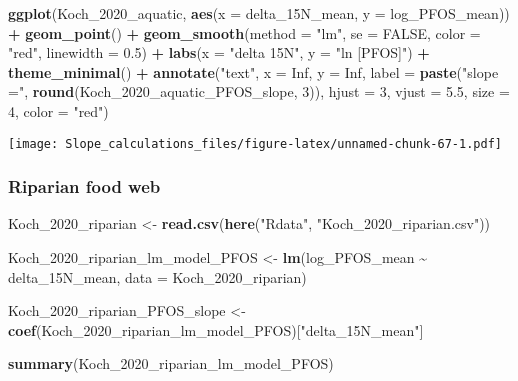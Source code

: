 \documentclass[
]{article}
\newenvironment{Shaded}{\begin{snugshade}}{\end{snugshade}}
\newcommand{\AttributeTok}[1]{\textcolor[rgb]{0.13,0.29,0.53}{#1}}
\newcommand{\ConstantTok}[1]{\textcolor[rgb]{0.56,0.35,0.01}{#1}}
\newcommand{\DecValTok}[1]{\textcolor[rgb]{0.00,0.00,0.81}{#1}}
\newcommand{\FloatTok}[1]{\textcolor[rgb]{0.00,0.00,0.81}{#1}}
\newcommand{\FunctionTok}[1]{\textcolor[rgb]{0.13,0.29,0.53}{\textbf{#1}}}
\newcommand{\NormalTok}[1]{#1}
\newcommand{\OtherTok}[1]{\textcolor[rgb]{0.56,0.35,0.01}{#1}}
\newcommand{\SpecialCharTok}[1]{\textcolor[rgb]{0.81,0.36,0.00}{\textbf{#1}}}
\newcommand{\StringTok}[1]{\textcolor[rgb]{0.31,0.60,0.02}{#1}}
\begin{document}
\begin{Shaded}
\begin{Highlighting}[]
\FunctionTok{ggplot}\NormalTok{(Koch\_2020\_aquatic, }\FunctionTok{aes}\NormalTok{(}\AttributeTok{x =}\NormalTok{ delta\_15N\_mean, }\AttributeTok{y =}\NormalTok{ log\_PFOS\_mean)) }\SpecialCharTok{+}
  \FunctionTok{geom\_point}\NormalTok{() }\SpecialCharTok{+}
  \FunctionTok{geom\_smooth}\NormalTok{(}\AttributeTok{method =} \StringTok{"lm"}\NormalTok{, }\AttributeTok{se =} \ConstantTok{FALSE}\NormalTok{, }\AttributeTok{color =} \StringTok{"red"}\NormalTok{, }\AttributeTok{linewidth =} \FloatTok{0.5}\NormalTok{) }\SpecialCharTok{+}
  \FunctionTok{labs}\NormalTok{(}\AttributeTok{x =} \StringTok{"delta 15N"}\NormalTok{,}
       \AttributeTok{y =} \StringTok{"ln [PFOS]"}\NormalTok{) }\SpecialCharTok{+}
  \FunctionTok{theme\_minimal}\NormalTok{() }\SpecialCharTok{+}
  \FunctionTok{annotate}\NormalTok{(}\StringTok{"text"}\NormalTok{, }\AttributeTok{x =} \ConstantTok{Inf}\NormalTok{, }\AttributeTok{y =} \ConstantTok{Inf}\NormalTok{, }\AttributeTok{label =} \FunctionTok{paste}\NormalTok{(}\StringTok{"slope ="}\NormalTok{, }\FunctionTok{round}\NormalTok{(Koch\_2020\_aquatic\_PFOS\_slope, }\DecValTok{3}\NormalTok{)), }
           \AttributeTok{hjust =} \DecValTok{3}\NormalTok{, }\AttributeTok{vjust =} \FloatTok{5.5}\NormalTok{, }\AttributeTok{size =} \DecValTok{4}\NormalTok{, }\AttributeTok{color =} \StringTok{"red"}\NormalTok{)}
\end{Highlighting}
\end{Shaded}

\texttt{[image: Slope\_calculations\_files/figure-latex/unnamed-chunk-67-1.pdf]}

\subsubsection{Riparian food web}\label{riparian-food-web}

\begin{Shaded}
\begin{Highlighting}[]
\NormalTok{Koch\_2020\_riparian }\OtherTok{\textless{}{-}} \FunctionTok{read.csv}\NormalTok{(}\FunctionTok{here}\NormalTok{(}\StringTok{"Rdata"}\NormalTok{, }\StringTok{"Koch\_2020\_riparian.csv"}\NormalTok{))}

\NormalTok{Koch\_2020\_riparian\_lm\_model\_PFOS }\OtherTok{\textless{}{-}} \FunctionTok{lm}\NormalTok{(log\_PFOS\_mean }\SpecialCharTok{\textasciitilde{}}\NormalTok{ delta\_15N\_mean,}
                                      \AttributeTok{data =}\NormalTok{ Koch\_2020\_riparian)}

\NormalTok{Koch\_2020\_riparian\_PFOS\_slope }\OtherTok{\textless{}{-}} \FunctionTok{coef}\NormalTok{(Koch\_2020\_riparian\_lm\_model\_PFOS)[}\StringTok{"delta\_15N\_mean"}\NormalTok{]}

\FunctionTok{summary}\NormalTok{(Koch\_2020\_riparian\_lm\_model\_PFOS)}
\end{Highlighting}
\end{Shaded}
\end{document}

